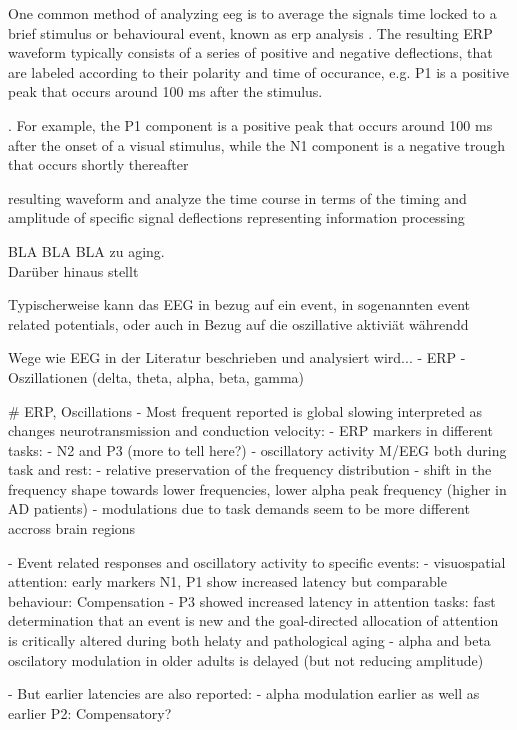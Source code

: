 One common method of analyzing \gls{eeg} is to average the signals time locked to a brief stimulus or behavioural event, known as \gls{erp} analysis \cite{}. The resulting ERP waveform typically consists of a series of positive and negative deflections, that are labeled according to their polarity and time of occurance, e.g. P1 is a positive peak that occurs around 100 ms after the stimulus. 

. For example, the P1 component is a positive peak that occurs around 100 ms after the onset of a visual stimulus, while the N1 component is a negative trough that occurs shortly thereafter

resulting waveform   and analyze the time course in terms of the timing and amplitude of specific signal deflections representing information processing 

BLA BLA BLA zu aging. 
\\ 
Darüber hinaus stellt 



Typischerweise kann das EEG in bezug auf ein event, in sogenannten event related potentials, oder auch in Bezug auf die oszillative aktiviät währendd   


Wege wie EEG in der Literatur beschrieben und analysiert wird... 
- ERP
- Oszillationen (delta, theta, alpha, beta, gamma)  

# ERP, Oscillations
- Most frequent reported is global slowing interpreted as changes neurotransmission and conduction velocity: 
    - ERP markers in different tasks: 
        - N2 and P3 (more to tell here?) 
    - oscillatory activity M/EEG both during task and rest: 
        - relative preservation of the frequency distribution 
        - shift in the frequency shape towards lower frequencies, lower alpha peak frequency (higher in AD patients)
        - modulations due to task demands seem to be more different accross brain regions

- Event related responses and oscillatory activity to specific events:
    - visuospatial attention: early markers N1, P1 show increased latency but comparable behaviour: Compensation
    - P3 showed increased latency in attention tasks: fast determination that an event is new and the goal-directed allocation of attention is critically altered during both helaty and pathological aging 
    - alpha and beta oscilatory modulation in older adults is delayed (but not reducing amplitude)

- But earlier latencies are also reported: 
    - alpha modulation earlier as well as earlier P2: Compensatory?

